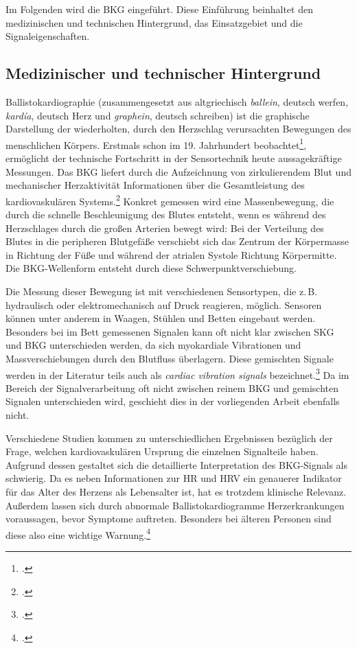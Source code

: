 	Im Folgenden wird die \acl{BKG} eingeführt. Diese Einführung beinhaltet den medizinischen und technischen Hintergrund, das Einsatzgebiet und die Signaleigenschaften.
	
	\subsection{Medizinischer und technischer Hintergrund}
	
	Ballistokardiographie (zusammengesetzt aus altgriechisch \textit{ballein}, deutsch \glq werfen\grq, \textit{kardía}, deutsch \glq Herz\grq{} und \textit{graphein}, deutsch \glq schreiben\grq) ist die graphische Darstellung der wiederholten, durch den Herzschlag verursachten Bewegungen des menschlichen Körpers. Erstmals schon im 19. Jahrhundert beobachtet\footcite{Gordon1877}, ermöglicht der technische Fortschritt in der Sensortechnik heute aussagekräftige Messungen. Das \ac{BKG} liefert durch die Aufzeichnung von zirkulierendem Blut und mechanischer Herzaktivität Informationen über die Gesamtleistung des kardiovaskulären Systems.\footcite{Pinheiro2010} Konkret gemessen wird eine Massenbewegung, die durch die schnelle Beschleunigung des Blutes entsteht, wenn es während des Herzschlages durch die großen Arterien bewegt wird: Bei der Verteilung des Blutes in die peripheren Blutgefäße verschiebt sich das Zentrum der Körpermasse in Richtung der Füße und während der atrialen Systole Richtung Körpermitte. Die \ac{BKG}-Wellenform entsteht durch diese Schwerpunktverschiebung.
	
	Die Messung dieser Bewegung ist mit verschiedenen Sensortypen, die z.\,B. hydraulisch oder elektromechanisch auf Druck reagieren, möglich. Sensoren können unter anderem in Waagen, Stühlen und Betten eingebaut werden. Besonders bei im Bett gemessenen Signalen kann oft nicht klar zwischen \ac{SKG} und \ac{BKG} unterschieden werden, da sich myokardiale Vibrationen und Massverschiebungen durch den Blutfluss überlagern. Diese gemischten Signale werden in der Literatur teils auch als \textit{cardiac vibration signals} bezeichnet.\footcite{Bruser2013} Da im Bereich der Signalverarbeitung oft nicht zwischen reinem \ac{BKG} und gemischten Signalen unterschieden wird, geschieht dies in der vorliegenden Arbeit ebenfalls nicht.
	
	Verschiedene Studien kommen zu unterschiedlichen Ergebnissen bezüglich der Frage, welchen kardiovaskulären Ursprung die einzelnen Signalteile haben. Aufgrund dessen gestaltet sich die detaillierte Interpretation des \ac{BKG}-Signals als schwierig. Da es neben Informationen zur \ac{HR} und \ac{HRV} ein genauerer Indikator für das Alter des Herzens als Lebensalter ist, hat es trotzdem klinische Relevanz. Außerdem lassen sich durch abnormale Ballistokardiogramme Herzerkrankungen voraussagen, bevor Symptome auftreten. Besonders bei älteren Personen sind diese also eine wichtige Warnung.\footcite[Vgl. zu diesem Absatz][]{Pinheiro2010}
	
